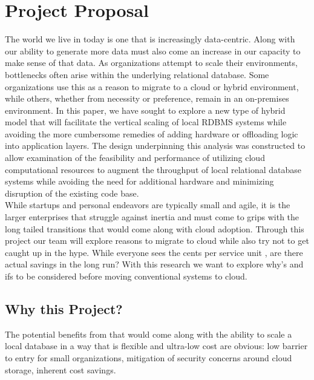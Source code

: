 \chapter*{Project Proposal}
\begin{flushleft}
    The world we live in today is one that is increasingly data-centric.   Along with our ability to generate more data must also come an increase in our capacity to make sense of that data.  As organizations attempt to scale their environments, bottlenecks often arise within the underlying relational database. Some organizations use this as a reason to migrate to a cloud or hybrid environment, while others, whether from necessity or preference, remain in an on-premises environment. In this paper, we have sought to explore a new type of hybrid model that will facilitate the vertical scaling of local RDBMS systems while avoiding the more cumbersome remedies of adding hardware or offloading logic into application layers. The design underpinning this analysis was constructed to allow examination of the feasibility and performance of utilizing cloud computational resources to augment the throughput of local relational database systems while avoiding the need for additional hardware and minimizing disruption of the existing code base.  
    \\

    While startups and personal endeavors are typically small and agile, it is the larger enterprises that struggle against inertia and must come to grips with the long tailed transitions that would come along with cloud adoption. Through this project our team will explore reasons to migrate to cloud while also try not to get caught up in the hype. While everyone sees the cents per service unit , are there actual savings in the long run? With this research we want to explore why's and ifs to be considered before moving  conventional systems to cloud. 

\end{flushleft}
  
\pagebreak

\section*{Why this Project?}
The potential benefits from that would come along with the ability to scale a local database in a way that is flexible and ultra-low cost are obvious: low barrier to entry for small organizations, mitigation of security concerns around cloud storage, inherent cost savings.




